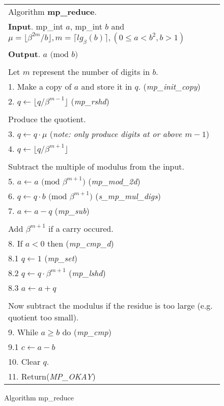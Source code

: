 \documentclass[b5paper]{book}
\begin{document}
\newpage\begin{figure}[!here]
\begin{small}
\begin{center}
\begin{tabular}{l}
\hline Algorithm \textbf{mp\_reduce}. \\
\textbf{Input}.   mp\_int $a$, mp\_int $b$ and $\mu = \lfloor \beta^{2m}/b \rfloor, m = \lceil lg_{\beta}(b) \rceil, (0 \le a < b^2, b > 1)$ \\
\textbf{Output}.  $a \mbox{ (mod }b\mbox{)}$ \\
\hline \\
Let $m$ represent the number of digits in $b$.  \\
1.  Make a copy of $a$ and store it in $q$.  (\textit{mp\_init\_copy}) \\
2.  $q \leftarrow \lfloor q / \beta^{m - 1} \rfloor$ (\textit{mp\_rshd}) \\
\\
Produce the quotient. \\
3.  $q \leftarrow q \cdot \mu$  (\textit{note: only produce digits at or above $m-1$}) \\
4.  $q \leftarrow \lfloor q / \beta^{m + 1} \rfloor$ \\
\\
Subtract the multiple of modulus from the input. \\
5.  $a \leftarrow a \mbox{ (mod }\beta^{m+1}\mbox{)}$ (\textit{mp\_mod\_2d}) \\
6.  $q \leftarrow q \cdot b \mbox{ (mod }\beta^{m+1}\mbox{)}$ (\textit{s\_mp\_mul\_digs}) \\
7.  $a \leftarrow a - q$ (\textit{mp\_sub}) \\
\\
Add $\beta^{m+1}$ if a carry occured. \\
8.  If $a < 0$ then (\textit{mp\_cmp\_d}) \\
\hspace{3mm}8.1  $q \leftarrow 1$ (\textit{mp\_set}) \\
\hspace{3mm}8.2  $q \leftarrow q \cdot \beta^{m+1}$ (\textit{mp\_lshd}) \\
\hspace{3mm}8.3  $a \leftarrow a + q$ \\
\\
Now subtract the modulus if the residue is too large (e.g. quotient too small). \\
9.  While $a \ge b$ do (\textit{mp\_cmp}) \\
\hspace{3mm}9.1  $c \leftarrow a - b$ \\
10.  Clear $q$. \\
11.  Return(\textit{MP\_OKAY}) \\
\hline
\end{tabular}
\end{center}
\end{small}
\caption{Algorithm mp\_reduce}
\end{figure}
\end{document}
